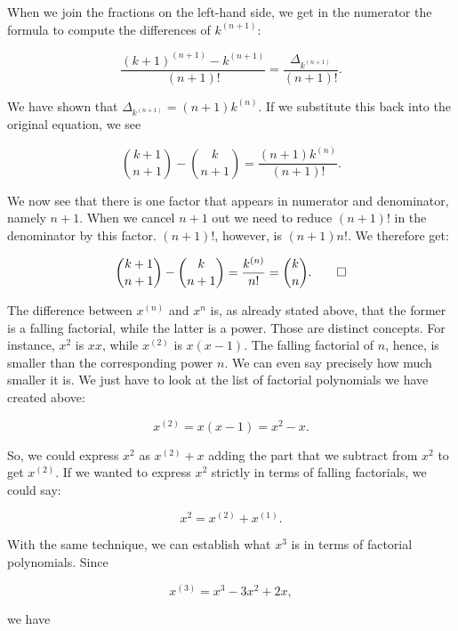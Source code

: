 \documentclass[tikz]{scrreprt}
\begin{document}
When we join the fractions on the left-hand side,
we get in the numerator the formula to compute 
the differences of $k^{(n+1)}$:

\[
\frac{(k+1)^{(n+1)} - k^{(n+1)}}{(n+1)!} =
\frac{\Delta_{k^{(n+1)}}}{(n+1)!}.
\]

We have shown that $\Delta_{k^{(n+1)}} = (n+1)k^{(n)}$.
If we substitute this back into the original equation,
we see

\begin{equation}
\binom{k+1}{n+1} - \binom{k}{n+1} =
\frac{(n+1){k^{(n)}}}{(n+1)!}.
\end{equation}

We now see that there is one factor
that appears in numerator and denominator,
namely $n+1$. When we cancel $n+1$ out
we need to
reduce $(n+1)!$ in the denominator by this factor.
$(n+1)!$, however, is $(n+1)n!$.
We therefore get:

\begin{equation}
\binom{k+1}{n+1} - \binom{k}{n+1} =
\frac{{k^{(n)}}}{n!} = 
\binom{k}{n}.\qed
\end{equation}

The difference between $x^{(n)}$ and $x^n$ is,
as already stated above, that the former is
a falling factorial, while the latter is
a power. Those are distinct concepts.
For instance, $x^2$ is $xx$, while
$x^{(2)}$ is $x(x-1)$. The falling factorial of $n$,
hence, is smaller than the corresponding power $n$.
We can even say precisely how much smaller it is.
We just have to look at the list of factorial
polynomials we have created above:

\begin{equation}
x^{(2)} = x(x-1) = x^2 - x.
\end{equation}

So, we could express $x^2$ as
$x^{(2)} + x$ adding the part that
we subtract from $x^2$ to get $x^{(2)}$.
If we wanted to express $x^2$ strictly
in terms of falling factorials, we could say: 

\begin{equation}
x^2 = x^{(2)} + x^{(1)}.
\end{equation}

With the same technique, we can establish 
what $x^3$ is in terms of factorial polynomials.
Since

\begin{equation}
x^{(3)} = x^3 - 3x^2 + 2x,
\end{equation}

we have
\end{document}
